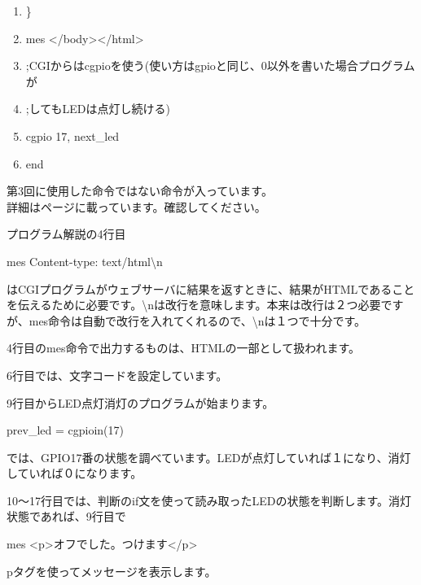 \documentclass[a4paper,12pt,dvipdfmx]{jarticle}
\begin{document}
\begin{boxedminipage}{0.95\textwidth}
\begin{enumerate}
	\item \}

	\item mes {\textquotedbl}{\textless}/body{\textgreater}{\textless}/html{\textgreater}{\textquotedbl}

	\item ;CGIからはcgpioを使う(使い方はgpioと同じ、0以外を書いた場合プログラムが

	\item ;してもLEDは点灯し続ける)

	\item cgpio 17, next\_led

	\item end
	\end{enumerate}

\end{boxedminipage}
\flushleft



第3回に使用した命令ではない命令が入っています。\\
詳細は\pageref{gpio}ページに載っています。確認してください。

プログラム解説の4行目

mes {\textquotedbl}Content-type: text/html{\textbackslash}n{\textquotedbl}

はCGIプログラムがウェブサーバに結果を返すときに、結果がHTMLであることを伝えるために必要です。{\textbackslash}nは改行を意味します。本来は改行は２つ必要ですが、mes命令は自動で改行を入れてくれるので、{\textbackslash}nは１つで十分です。


\bigskip
\clearpage
4行目のmes命令で出力するものは、HTMLの一部として扱われます。

\bigskip

6行目では、文字コードを設定しています。

\bigskip

9行目からLED点灯消灯のプログラムが始まります。

prev\_led = cgpioin(17)

では、GPIO17番の状態を調べています。LEDが点灯していれば１になり、消灯していれば０になります。


\bigskip


10〜17行目では、判断のif文を使って読み取ったLEDの状態を判断します。消灯状態であれば、9行目で

mes
	{\textquotedbl}{\textless}p{\textgreater}オフでした。つけます{\textless}/p{\textgreater}{\textquotedbl}

pタグを使ってメッセージを表示します。
\end{document}
